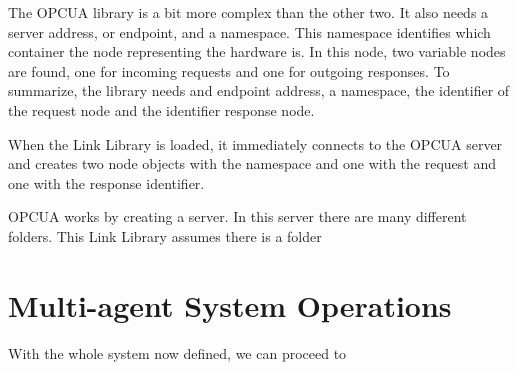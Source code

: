 
The \acrshort{OPCUA} library is a bit more complex than the other two. It also needs a server address, or endpoint, and a namespace. This namespace identifies which container the node representing the hardware is. In this node, two variable nodes are found, one for incoming requests and one for outgoing responses. To summarize, the library needs and endpoint address, a namespace, the identifier of the request node and the identifier response node.

When the Link Library is loaded, it immediately connects to the \acrshort{OPCUA} server and creates two node objects with the namespace and one with the request and one with the response identifier. 




 \acrshort{OPCUA} works by creating a server. In this server there are many different folders. This Link Library assumes there is a folder 




\section{Multi-agent System Operations}
\label{sec:mas_operations}

With the whole system now defined, we can proceed to 
